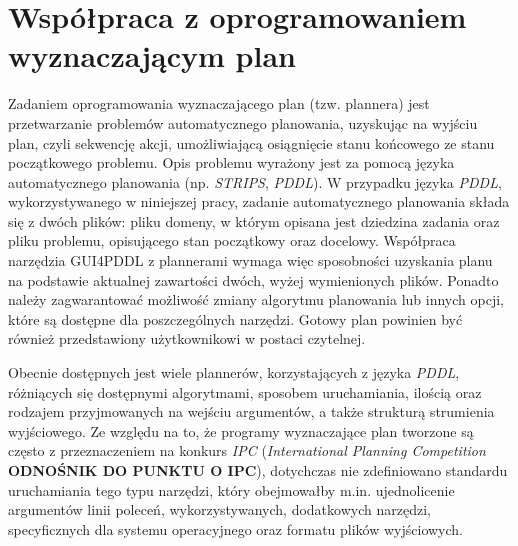 \section{Współpraca z oprogramowaniem wyznaczającym plan}
\label{sec:wspolpraca}
Zadaniem oprogramowania wyznaczającego plan (tzw. plannera) jest przetwarzanie problemów automatycznego planowania, uzyskując na wyjściu plan, czyli sekwencję akcji, umożliwiającą osiągnięcie stanu końcowego ze stanu początkowego problemu. Opis problemu wyrażony jest za pomocą języka automatycznego planowania (np. \textit{STRIPS}, \textit{PDDL}). W przypadku języka \textit{PDDL}, wykorzystywanego w niniejszej pracy, zadanie automatycznego planowania składa się z dwóch plików: pliku domeny, w którym opisana jest dziedzina zadania oraz pliku problemu, opisującego stan początkowy oraz docelowy. Współpraca narzędzia GUI4PDDL z plannerami wymaga więc sposobności uzyskania planu na podstawie aktualnej zawartości dwóch, wyżej wymienionych plików. Ponadto należy zagwarantować możliwość zmiany algorytmu planowania lub innych opcji, które są dostępne dla poszczególnych narzędzi. Gotowy plan powinien być również przedstawiony użytkownikowi w postaci czytelnej.

Obecnie dostępnych jest wiele plannerów, korzystających z języka \textit{PDDL}, różniących się dostępnymi algorytmami, sposobem uruchamiania, ilością oraz rodzajem przyjmowanych na wejściu argumentów, a także strukturą strumienia wyjściowego. Ze względu na to, że programy wyznaczające plan tworzone są często z przeznaczeniem na konkurs \textit{IPC} (\textit{International Planning Competition} \textbf{ODNOŚNIK DO PUNKTU O IPC}), dotychczas nie zdefiniowano standardu uruchamiania tego typu narzędzi, który obejmowałby m.in. ujednolicenie argumentów linii poleceń, wykorzystywanych, dodatkowych narzędzi, specyficznych dla systemu operacyjnego oraz formatu plików wyjściowych.

